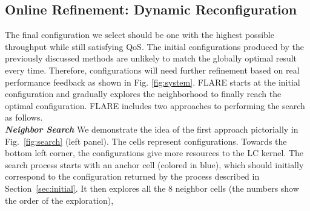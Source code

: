 	\subsection{Online Refinement: Dynamic Reconfiguration}
The final configuration we select should be one with the highest possible throughput while still satisfying QoS. The initial configurations produced by the previously discussed methods are unlikely to match the globally optimal result every time. Therefore, configurations will need further refinement based on real performance feedback as shown in Fig. \ref{fig:system}. %
FLARE starts at the initial configuration and gradually explores the neighborhood to finally reach the optimal configuration. FLARE includes two approaches to performing the search as follows.\\
\textbf{\textit{Neighbor Search}} We demonstrate the idea of the first approach pictorially in Fig.~\ref{fig:search} (left panel). The cells represent configurations. Towards the bottom left corner, the configurations give more resources to the LC kernel. %
The search process starts with an anchor cell (colored in blue), which should initially correspond to the configuration returned by the process described in Section~\ref{sec:initial}. It then explores all the 8 neighbor cells (the numbers show the order of the exploration), %
